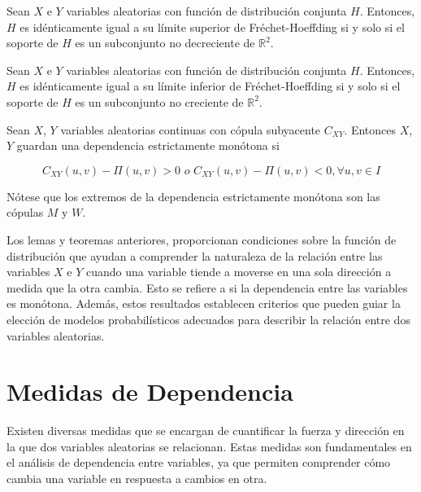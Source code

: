 \begin{teor}
    Sean $X$ e $Y$ variables aleatorias con función de distribución conjunta $H$. Entonces, $H$ es idénticamente igual a su límite superior de Fréchet-Hoeffding si y solo si el soporte de $H$ es un subconjunto no decreciente de $\mathbb{R}^2$.
\end{teor}

\begin{teor}
    Sean $X$ e $Y$ variables aleatorias con función de distribución conjunta $H$. Entonces, $H$ es idénticamente igual a su límite inferior de Fréchet-Hoeffding si y solo si el soporte de $H$ es un subconjunto no creciente de $\mathbb{R}^2$.
\end{teor}

\begin{defn}
    Sean $X$, $Y$ variables aleatorias continuas con cópula subyacente $C_{XY}$. Entonces $X$, $Y$ guardan una dependencia
    estrictamente monótona si 
    
    \begin{equation}
        C_{XY}(u, v) - \Pi(u, v) > 0 \textit{ o } C_{XY}(u, v) - \Pi(u, v) < 0, \forall u, v \in I
    \end{equation}
    
    Nótese que los extremos de la dependencia estrictamente monótona son las cópulas $M$ y $W$. \cite[pág 42]{TesisEmanuel}
\end{defn}


Los lemas y teoremas anteriores, proporcionan condiciones sobre la función de distribución que ayudan a comprender la naturaleza de la relación entre las variables $X$ e $Y$ cuando una variable tiende a moverse en una sola dirección a medida que la otra cambia. Esto se refiere a si la dependencia entre las variables es monótona. Además, estos resultados establecen criterios que pueden guiar la elección de modelos probabilísticos adecuados para describir la relación entre dos variables aleatorias.

\section{Medidas de Dependencia}

Existen diversas medidas que se encargan de cuantificar la fuerza y dirección en la que dos variables aleatorias se relacionan. Estas medidas son fundamentales en el análisis de dependencia entre variables, ya que permiten comprender cómo cambia una variable en respuesta a cambios en otra. 

